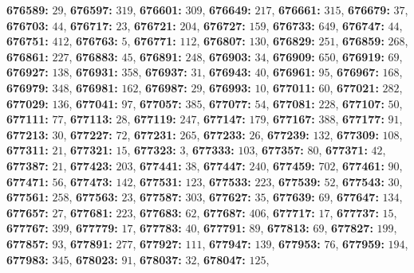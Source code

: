 \textsf{\bfseries 676589:} $29$, \textsf{\bfseries 676597:} $319$, \textsf{\bfseries 676601:} $309$, \textsf{\bfseries 676649:} $217$, \textsf{\bfseries 676661:} $315$, \textsf{\bfseries 676679:} $37$, \textsf{\bfseries 676703:} $44$, \textsf{\bfseries 676717:} $23$, \textsf{\bfseries 676721:} $204$, \textsf{\bfseries 676727:} $159$, \textsf{\bfseries 676733:} $649$, \textsf{\bfseries 676747:} $44$, \textsf{\bfseries 676751:} $412$, \textsf{\bfseries 676763:} $5$, \textsf{\bfseries 676771:} $112$, \textsf{\bfseries 676807:} $130$, \textsf{\bfseries 676829:} $251$, \textsf{\bfseries 676859:} $268$, \textsf{\bfseries 676861:} $227$, \textsf{\bfseries 676883:} $45$, \textsf{\bfseries 676891:} $248$, \textsf{\bfseries 676903:} $34$, \textsf{\bfseries 676909:} $650$, \textsf{\bfseries 676919:} $69$, \textsf{\bfseries 676927:} $138$, \textsf{\bfseries 676931:} $358$, \textsf{\bfseries 676937:} $31$, \textsf{\bfseries 676943:} $40$, \textsf{\bfseries 676961:} $95$, \textsf{\bfseries 676967:} $168$, \textsf{\bfseries 676979:} $348$, \textsf{\bfseries 676981:} $162$, \textsf{\bfseries 676987:} $29$, \textsf{\bfseries 676993:} $10$, \textsf{\bfseries 677011:} $60$, \textsf{\bfseries 677021:} $282$, \textsf{\bfseries 677029:} $136$, \textsf{\bfseries 677041:} $97$, \textsf{\bfseries 677057:} $385$, \textsf{\bfseries 677077:} $54$, \textsf{\bfseries 677081:} $228$, \textsf{\bfseries 677107:} $50$, \textsf{\bfseries 677111:} $77$, \textsf{\bfseries 677113:} $28$, \textsf{\bfseries 677119:} $247$, \textsf{\bfseries 677147:} $179$, \textsf{\bfseries 677167:} $388$, \textsf{\bfseries 677177:} $91$, \textsf{\bfseries 677213:} $30$, \textsf{\bfseries 677227:} $72$, \textsf{\bfseries 677231:} $265$, \textsf{\bfseries 677233:} $26$, \textsf{\bfseries 677239:} $132$, \textsf{\bfseries 677309:} $108$, \textsf{\bfseries 677311:} $21$, \textsf{\bfseries 677321:} $15$, \textsf{\bfseries 677323:} $3$, \textsf{\bfseries 677333:} $103$, \textsf{\bfseries 677357:} $80$, \textsf{\bfseries 677371:} $42$, \textsf{\bfseries 677387:} $21$, \textsf{\bfseries 677423:} $203$, \textsf{\bfseries 677441:} $38$, \textsf{\bfseries 677447:} $240$, \textsf{\bfseries 677459:} $702$, \textsf{\bfseries 677461:} $90$, \textsf{\bfseries 677471:} $56$, \textsf{\bfseries 677473:} $142$, \textsf{\bfseries 677531:} $123$, \textsf{\bfseries 677533:} $223$, \textsf{\bfseries 677539:} $52$, \textsf{\bfseries 677543:} $30$, \textsf{\bfseries 677561:} $258$, \textsf{\bfseries 677563:} $23$, \textsf{\bfseries 677587:} $303$, \textsf{\bfseries 677627:} $35$, \textsf{\bfseries 677639:} $69$, \textsf{\bfseries 677647:} $134$, \textsf{\bfseries 677657:} $27$, \textsf{\bfseries 677681:} $223$, \textsf{\bfseries 677683:} $62$, \textsf{\bfseries 677687:} $406$, \textsf{\bfseries 677717:} $17$, \textsf{\bfseries 677737:} $15$, \textsf{\bfseries 677767:} $399$, \textsf{\bfseries 677779:} $17$, \textsf{\bfseries 677783:} $40$, \textsf{\bfseries 677791:} $89$, \textsf{\bfseries 677813:} $69$, \textsf{\bfseries 677827:} $199$, \textsf{\bfseries 677857:} $93$, \textsf{\bfseries 677891:} $277$, \textsf{\bfseries 677927:} $111$, \textsf{\bfseries 677947:} $139$, \textsf{\bfseries 677953:} $76$, \textsf{\bfseries 677959:} $194$, \textsf{\bfseries 677983:} $345$, \textsf{\bfseries 678023:} $91$, \textsf{\bfseries 678037:} $32$, \textsf{\bfseries 678047:} $125$, 
